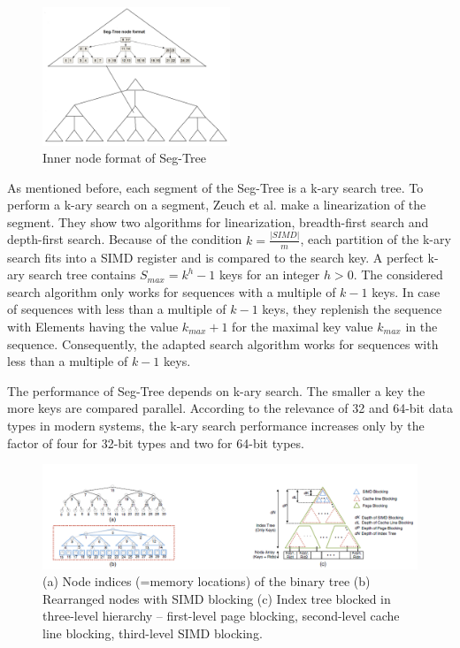 \documentclass[conference]{IEEEtran}
\begin{document}
\begin{figure}
	\includegraphics[width=0.5\textwidth]{figure_2.png}
	\caption{Inner node format of Seg-Tree}
	\label{fig}
\end{figure}

As mentioned before, each segment of the Seg-Tree is a k-ary search tree. To perform a k-ary search on a segment, Zeuch et al. make a linearization of the segment. They show two algorithms for linearization, breadth-first search and depth-first search. Because of the condition $k = \frac{\vert SIMD \vert }{m}$, each partition of the k-ary search fits into a SIMD register and is compared to the search key. A perfect k-ary search tree contains  $S_{max} = k^h - 1$ keys for an integer $h > 0$. The considered search algorithm only works for sequences with a multiple of $k-1$ keys. In case of  sequences with less than a multiple of $k-1$ keys, they replenish the sequence with Elements having the value $k_{max} + 1$ for the maximal key value $k_{max}$ in the sequence. Consequently, the adapted search algorithm works for sequences with less than a multiple of $k-1$ keys.

The performance of Seg-Tree depends on k-ary search. The smaller a key the more keys are compared parallel. According to the relevance of 32 and 64-bit data types in modern systems, the k-ary search performance increases only by the factor of four for 32-bit types and two for 64-bit types.

\begin{figure}
	\includegraphics[width=1.0\textwidth]{figure_3.png}
	\caption{(a) Node indices (=memory locations) of the binary tree (b) Rearranged nodes with SIMD blocking (c) Index tree blocked in three-level
		hierarchy – first-level page blocking, second-level cache line blocking, third-level SIMD blocking.}
	\label{fig}
\end{figure}
\end{document}
